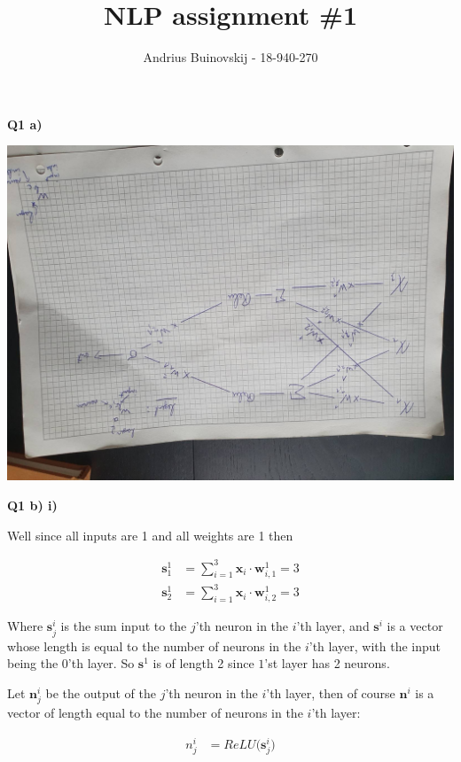 \documentclass{article}
\begin{document}
\title{NLP assignment \#1}
\author{Andrius Buinovskij - 18-940-270}
\date{}

\maketitle

\textbf{Q1 a)}

	\includegraphics[angle=90,width=\textwidth]{comp_graph}

\textbf{Q1 b) i)}
	
	Well since all inputs are 1 and all weights are 1 then
	
	\begin{align}
		\mathbf{s}^1_1 &= \sum^3_{i=1} \mathbf{x}_i\cdot \mathbf{w}^1_{i, 1} = 3\\
		\mathbf{s}^1_2 &= \sum^3_{i=1} \mathbf{x}_i\cdot \mathbf{w}^1_{i, 2} = 3
	\end{align}
	
	Where $\mathbf{s}^i_j$ is the sum input to the $j$'th neuron in the $i$'th layer, and $\mathbf{s}^i$ is a vector whose length is equal to the number of neurons in the $i$'th layer, with the input being the $0$'th layer. So $\mathbf{s}^1$ is of length 2 since $1$'st layer has 2 neurons. 
	
	Let $\mathbf{n}^i_j$ be the output of the $j$'th neuron in the $i$'th layer, then of course $\mathbf{n}^i$ is a vector of length equal to the number of neurons in the $i$'th layer:
	
	\begin{align}
		n^i_j &= ReLU\big(\mathbf{s}^i_j\big)
	\end{align}
	
\end{document}
